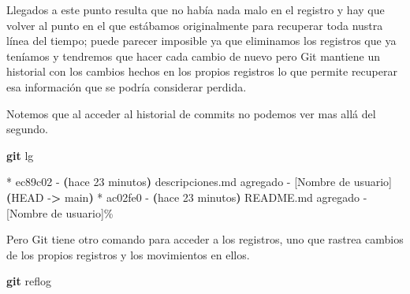 \documentclass[
]{book}
\newenvironment{Shaded}{\begin{snugshade}}{\end{snugshade}}
\newcommand{\AttributeTok}[1]{\textcolor[rgb]{0.13,0.29,0.53}{#1}}
\newcommand{\ErrorTok}[1]{\textcolor[rgb]{0.64,0.00,0.00}{\textbf{#1}}}
\newcommand{\ExtensionTok}[1]{#1}
\newcommand{\FunctionTok}[1]{\textcolor[rgb]{0.13,0.29,0.53}{\textbf{#1}}}
\newcommand{\KeywordTok}[1]{\textcolor[rgb]{0.13,0.29,0.53}{\textbf{#1}}}
\newcommand{\NormalTok}[1]{#1}
\newcommand{\OperatorTok}[1]{\textcolor[rgb]{0.81,0.36,0.00}{\textbf{#1}}}
\begin{document}
Llegados a este punto resulta que no había nada malo en el registro y hay que volver al punto en el que estábamos originalmente para recuperar toda nustra línea del tiempo; puede parecer imposible ya que eliminamos los registros que ya teníamos y tendremos que hacer cada cambio de nuevo pero Git mantiene un historial con los cambios hechos en los propios registros lo que permite recuperar esa información que se podría considerar perdida.

Notemos que al acceder al historial de commits no podemos ver mas allá del segundo.

\begin{Shaded}
\begin{Highlighting}[]
\FunctionTok{git}\NormalTok{ lg}
\end{Highlighting}
\end{Shaded}

\begin{Shaded}
\begin{Highlighting}[]
\ExtensionTok{*}\NormalTok{ ec89c02 }\AttributeTok{{-}} \ErrorTok{(}\ExtensionTok{hace}\NormalTok{ 23 minutos}\KeywordTok{)} \ExtensionTok{descripciones.md}\NormalTok{ agregado }\AttributeTok{{-}}\NormalTok{ [Nombre de usuario] }\ErrorTok{(}\ExtensionTok{HEAD} \AttributeTok{{-}}\OperatorTok{\textgreater{}}\NormalTok{ main}\KeywordTok{)}
\ExtensionTok{*}\NormalTok{ ac02fe0 }\AttributeTok{{-}} \ErrorTok{(}\ExtensionTok{hace}\NormalTok{ 23 minutos}\KeywordTok{)} \ExtensionTok{README.md}\NormalTok{ agregado }\AttributeTok{{-}}\NormalTok{ [Nombre de usuario]\%  }
\end{Highlighting}
\end{Shaded}

Pero Git tiene otro comando para acceder a los registros, uno que rastrea cambios de los propios registros y los movimientos en ellos.

\begin{Shaded}
\begin{Highlighting}[]
\FunctionTok{git}\NormalTok{ reflog}
\end{Highlighting}
\end{Shaded}
\end{document}
